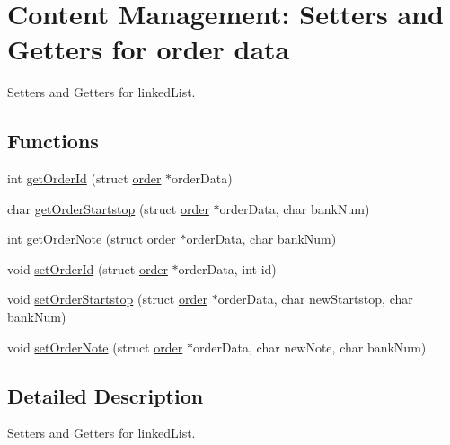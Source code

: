 \hypertarget{group__group2}{\section{Content Management\-: Setters and Getters for order data}
\label{group__group2}
}


Setters and Getters for linked\-List.  


\subsection*{Functions}
\begin{DoxyCompactItemize}
\item 
int \hyperlink{group__group2_ga2eecdd9441c2808156e2823cf2647acf}{get\-Order\-Id} (struct \hyperlink{structorder}{order} $\ast$order\-Data)
\item 
char \hyperlink{group__group2_ga73e537f55ebe8a58816876e8c62c0613}{get\-Order\-Startstop} (struct \hyperlink{structorder}{order} $\ast$order\-Data, char bank\-Num)
\item 
int \hyperlink{group__group2_ga2300cf7be3777ca0d27069a65378d41d}{get\-Order\-Note} (struct \hyperlink{structorder}{order} $\ast$order\-Data, char bank\-Num)
\item 
void \hyperlink{group__group2_gaa1c09c554716a9c9267e6bdea34f4040}{set\-Order\-Id} (struct \hyperlink{structorder}{order} $\ast$order\-Data, int id)
\item 
void \hyperlink{group__group2_ga2772e75f849e208065637fb8e40816f6}{set\-Order\-Startstop} (struct \hyperlink{structorder}{order} $\ast$order\-Data, char new\-Startstop, char bank\-Num)
\item 
void \hyperlink{group__group2_gac4be440700d9a5aba95aab1486c043d6}{set\-Order\-Note} (struct \hyperlink{structorder}{order} $\ast$order\-Data, char new\-Note, char bank\-Num)
\end{DoxyCompactItemize}


\subsection{Detailed Description}
Setters and Getters for linked\-List. 

